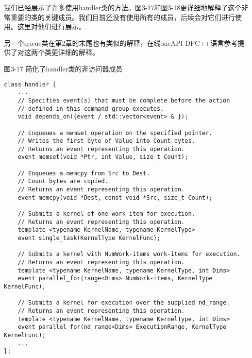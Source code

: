 我们已经展示了许多使用handler类的方法。图3-17和图3-18更详细地解释了这个非常重要的类的关键成员。我们目前还没有使用所有的成员，后续会对它们进行使用。这里对他们进行展示。\par

另一个queue类在第2章的末尾也有类似的解释，在线oneAPI DPC++语言参考提供了对这两个类更详细的解释。\par

\hspace*{\fill} \par %
图3-17 简化了handler类的非访问器成员
\begin{lstlisting}[caption={}]
class handler {
	...
	// Specifies event(s) that must be complete before the action
	// defined in this command group executes.
	void depends_on({event / std::vector<event> & });
	
	// Enqueues a memset operation on the specified pointer.
	// Writes the first byte of Value into Count bytes.
	// Returns an event representing this operation.
	event memset(void *Ptr, int Value, size_t Count);
	
	// Enqueues a memcpy from Src to Dest.
	// Count bytes are copied.
	// Returns an event representing this operation.
	event memcpy(void *Dest, const void *Src, size_t Count);
	
	// Submits a kernel of one work-item for execution.
	// Returns an event representing this operation.
	template <typename KernelName, typename KernelType>
	event single_task(KernelType KernelFunc);
	
	// Submits a kernel with NumWork-items work-items for execution.
	// Returns an event representing this operation.
	template <typename KernelName, typename KernelType, int Dims>
	event parallel_for(range<Dims> NumWork-items, KernelType KernelFunc);
	
	// Submits a kernel for execution over the supplied nd_range.
	// Returns an event representing this operation.
	template <typename KernelName, typename KernelType, int Dims>
	event parallel_for(nd_range<Dims> ExecutionRange, KernelType KernelFunc);
	...
};
\end{lstlisting}


